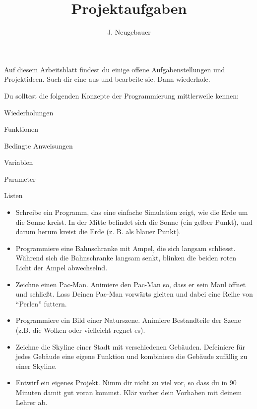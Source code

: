 \documentclass[9pt, a5paper]{scrartcl}
\author{J. Neugebauer}
\title{Projektaufgaben}
\date{\Heute}
\begin{document}
\ReiheTitel

Auf diesem Arbeitsblatt findest du einige offene Aufgabenstellungen und Projektideen. Such dir eine aus und bearbeite sie. Dann wiederhole.

Du solltest die folgenden Konzepte der Programmierung mittlerweile kennen:
\begin{multicols}{3}
	Wiederholungen
	
	Funktionen
	
	Bedingte Anweisungen
	
	Variablen
	
	Parameter
	
	Listen
\end{multicols}

\begin{itemize}
	\item Schreibe ein Programm, das eine einfache Simulation zeigt, wie die Erde um die Sonne kreist. In der Mitte befindet sich die Sonne (ein gelber Punkt), und darum herum kreist die Erde (z. B. als blauer Punkt).
	
	\item Programmiere eine Bahnschranke mit Ampel, die sich langsam schliesst. Während sich die Bahnschranke langsam senkt, blinken die beiden roten Licht der Ampel abwechselnd.
	
	\item Zeichne einen Pac-Man. Animiere den Pac-Man so, dass er sein Maul öffnet und schließt. Lass Deinen Pac-Man vorwärts gleiten und dabei eine Reihe von \enquote{Perlen} futtern.
	
	\item Programmiere ein Bild einer Naturszene. Animiere Bestandteile der Szene (z.B. die Wolken oder vielleicht regnet es).
	
	\item Zeichne die Skyline einer Stadt mit verschiedenen Gebäuden. Defeiniere für jedes Gebäude eine eigene Funktion und kombiniere die Gebäude zufällig zu einer Skyline. 
	
	\item Entwirf ein eigenes Projekt. Nimm dir nicht zu viel vor, so dass du in 90 Minuten damit gut voran kommst. Klär vorher dein Vorhaben mit deinem Lehrer ab.
\end{itemize}
\end{document}
